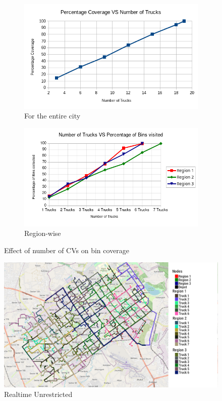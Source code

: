 \documentclass[12pt]{article}
\begin{document}
\begin{figure}[H]
    \centering
    \begin{subfigure}{0.5\textwidth}
        \centering
        \includegraphics[width=\linewidth]{coverage_VS_number_of_trucks.png}
        \caption{For the entire city}\label{figc1}
    \end{subfigure}%
    \begin{subfigure}{0.5\textwidth}
        \centering
        \includegraphics[width=\linewidth]{number_of_trucks_VS_bins_visited.png}
        \caption{Region-wise}\label{figc2}
    \end{subfigure}
    \caption{Effect of number of CVs on bin coverage}
    \label{fig3}
\end{figure}

 

\begin{figure}[H]
    \centering
    \includegraphics[scale=0.4]{Dynamic_weighted_unrestricted.png} %
    \caption{Realtime Unrestricted}\label{fig2}
\end{figure}
\end{document}
